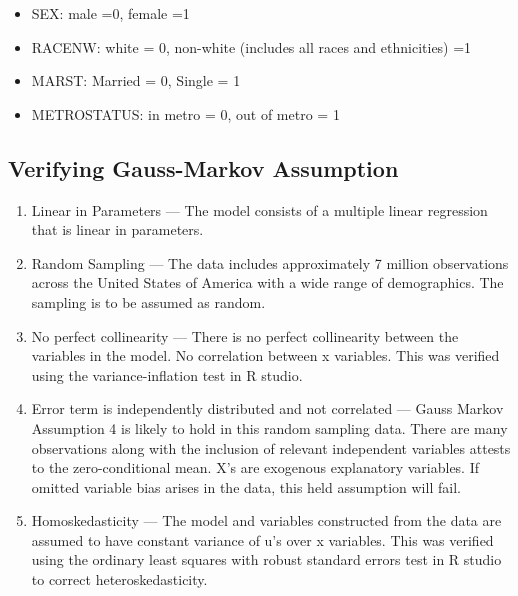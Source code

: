 \documentclass[12pt, English]{article}
\begin{document}
\begin{itemize}
\item SEX: male =0, female =1

\item RACENW: white = 0, non-white (includes all races and ethnicities) =1

\item MARST: Married = 0, Single = 1 

\item METROSTATUS: in metro = 0, out of metro = 1 


\end{itemize}
\subsection{Verifying Gauss-Markov Assumption}

\begin{enumerate}
    \item  Linear in Parameters — The model consists of a multiple linear regression that is linear in parameters.
    
    \item Random Sampling — The data includes approximately 7 million observations across the United States of America with a wide range of demographics. The sampling is to be assumed as random. 
    
    \item No perfect collinearity — There is no perfect collinearity between the variables in the model. No correlation between x variables. This was verified using the variance-inflation test in R studio. 
    
    \item Error term is independently distributed and not correlated — Gauss Markov Assumption 4 is likely to hold in this random sampling data. There are many observations along with the inclusion of relevant independent variables attests to the zero-conditional mean. X’s are exogenous explanatory variables. If omitted variable bias arises in the data, this held assumption will fail.
    
    \item Homoskedasticity — The model and variables constructed from the
    data are assumed to have constant variance of u’s over x variables. This was verified using the ordinary least squares with robust standard errors test in R studio to correct heteroskedasticity. 
\end{enumerate}
\end{document}
